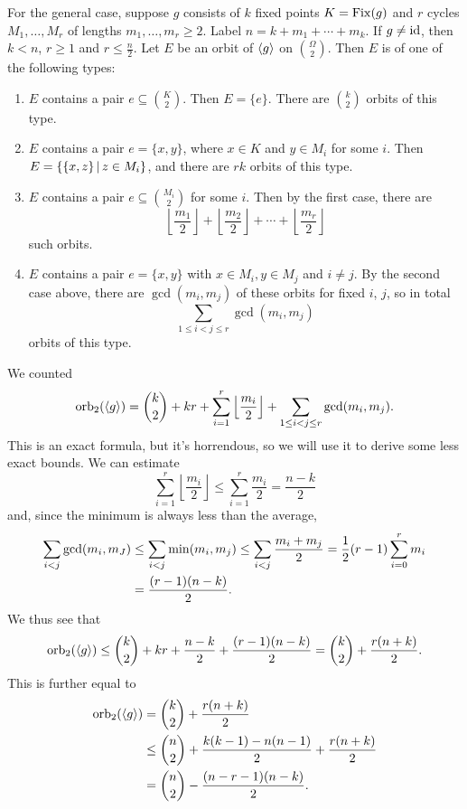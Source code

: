 For the general case, suppose $g$ consists of $k$ fixed points $K = \operatorname{Fix}(g)$ and
$r$ cycles $M_1, \ldots, M_r$ of lengths $m_1, \ldots, m_r \ge 2$.
Label $n = k + m_1 + \cdots + m_k$.
If $g \ne \operatorname{id}$, then $k < n$, $r \ge 1$ and $r \le \frac{n}{2}$.
Let $E$ be an orbit of $\left< g \right>$ on $\binom{\Omega}{2}$.
Then $E$ is of one of the following types:
\begin{enumerate}
\item $E$ contains a pair $e \subseteq \binom{K}{2}$.
  Then $E = \{e\}$.
  There are $\binom{k}{2}$ orbits of this type.
\item $E$ contains a pair $e = \{x,y\}$, where $x \in K$ and $y \in M_i$ for
  some $i$.
  Then $E = \{ \{x, z\} \,|\, z \in M_i \}$, and there are $rk$ orbits of this
  type.
\item $E$ contains a pair $e \subseteq \binom{M_i}{2}$ for some $i$.
  Then by the first case, there are
  \[
	\left\lfloor \frac{m_1}{2} \right\rfloor
	+ \left\lfloor \frac{m_2}{2} \right\rfloor
	+ \cdots
	+ \left\lfloor \frac{m_r}{2} \right\rfloor
  \]
  such orbits.
\item $E$ contains a pair $e = \{x,y\}$ with $x \in M_i, y \in M_j$ and $i \ne
  j$.
  By the second case above, there are $\operatorname{gcd}(m_i, m_j)$ of these
  orbits for fixed $i$, $j$, so in total
  \[
	\sum_{1 \le i < j \le r} \operatorname{gcd}(m_i, m_j)
  \]
  orbits of this type.
\end{enumerate}
We counted
\[
  \operatorname{orb}_2(\left< g \right>)
  = \binom{k}{2} + kr + \sum_{i=1}^r \left\lfloor \frac{m_i}{2} \right\rfloor
  + \sum_{1 \le i < j \le r} \operatorname{gcd}(m_i, m_j).
\]
This is an exact formula, but it's horrendous, so we will use it to derive some
less exact bounds.
We can estimate
\[
  \sum_{i=1}^r \left\lfloor \frac{m_i}{2} \right\rfloor
  \le \sum_{i=1}^r \frac{m_i}{2}
  = \frac{n-k}{2}
\]
and, since the minimum is always less than the average,
\begin{align*}
  \sum_{i<j} \operatorname{gcd}(m_i, m_J)
  &\le \sum_{i<j} \min(m_i, m_j)
  \le \sum_{i<j} \frac{m_i+m_j}{2}
  = \frac{1}{2} (r-1) \sum_{i=0}^r m_i \\
  &= \frac{(r-1)(n-k)}{2}.
\end{align*}
We thus see that
\[
  \operatorname{orb}_2(\left< g \right>)
  \le \binom{k}{2} + kr + \frac{n-k}{2} + \frac{(r-1)(n-k)}{2}
  = \binom{k}{2} + \frac{r(n+k)}{2}.
\]
This is further equal to
\begin{align*}
  \operatorname{orb}_2(\left< g \right>)
  &= \binom{k}{2} + \frac{r(n+k)}{2} \\
  &\le \binom{n}{2} + \frac{k(k-1)-n(n-1)}{2} + \frac{r(n+k)}{2} \\
  &= \binom{n}{2} - \frac{(n-r-1)(n-k)}{2}.
\end{align*}

